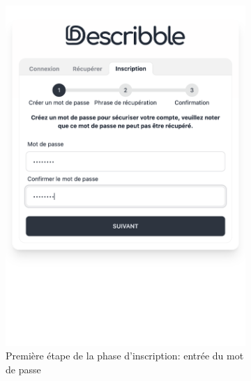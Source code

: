 \begin{figure}[H]
    \centering
    \begin{subfigure}[t]{0.45\textwidth}
        \centering
        \includegraphics[width=\textwidth]{assets/figures/describble-register-1.png}
        \caption{Première étape de la phase d'inscription: entrée du mot de passe\label{fig:register1}}
    \end{subfigure}
    \hfill
    \begin{subfigure}[t]{0.45\textwidth}
        \centering

\end{subfigure}
\end{figure}
